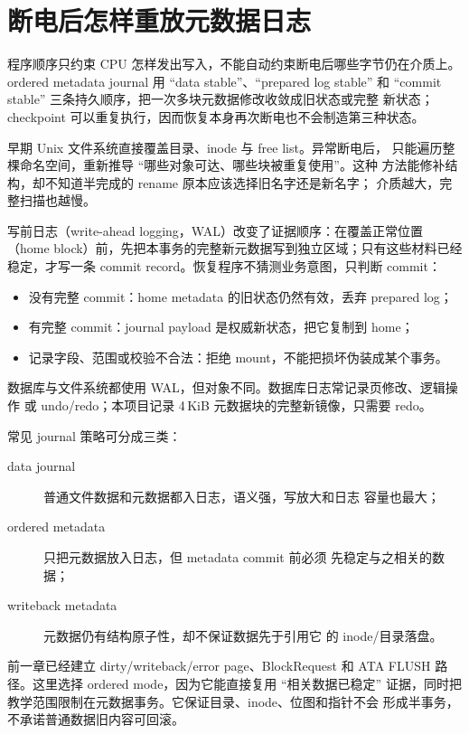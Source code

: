 \section{断电后怎样重放元数据日志}

程序顺序只约束 CPU 怎样发出写入，不能自动约束断电后哪些字节仍在介质上。
ordered metadata journal 用 ``data stable''、``prepared log stable'' 和
``commit stable'' 三条持久顺序，把一次多块元数据修改收敛成旧状态或完整
新状态；checkpoint 可以重复执行，因而恢复本身再次断电也不会制造第三种状态。

早期 Unix 文件系统直接覆盖目录、inode 与 free list。异常断电后，
只能遍历整棵命名空间，重新推导 ``哪些对象可达、哪些块被重复使用''。这种
方法能修补结构，却不知道半完成的 rename 原本应该选择旧名字还是新名字；
介质越大，完整扫描也越慢。

写前日志（write-ahead logging，WAL）改变了证据顺序：在覆盖正常位置
（home block）前，先把本事务的完整新元数据写到独立区域；只有这些材料已经
稳定，才写一条 commit record。恢复程序不猜测业务意图，只判断 commit：

\begin{itemize}
  \item 没有完整 commit：home metadata 的旧状态仍然有效，丢弃 prepared log；
  \item 有完整 commit：journal payload 是权威新状态，把它复制到 home；
  \item 记录字段、范围或校验不合法：拒绝 mount，不能把损坏伪装成某个事务。
\end{itemize}

数据库与文件系统都使用 WAL，但对象不同。数据库日志常记录页修改、逻辑操作
或 undo/redo；本项目记录 4\,KiB 元数据块的完整新镜像，只需要 redo。

常见 journal 策略可分成三类：

\begin{description}
  \item[data journal] 普通文件数据和元数据都入日志，语义强，写放大和日志
    容量也最大；
  \item[ordered metadata] 只把元数据放入日志，但 metadata commit 前必须
    先稳定与之相关的数据；
  \item[writeback metadata] 元数据仍有结构原子性，却不保证数据先于引用它
    的 inode/目录落盘。
\end{description}

前一章已经建立 dirty/writeback/error page、BlockRequest 和 ATA FLUSH
路径。这里选择 ordered mode，因为它能直接复用 ``相关数据已稳定''
证据，同时把教学范围限制在元数据事务。它保证目录、inode、位图和指针不会
形成半事务，不承诺普通数据旧内容可回滚。

